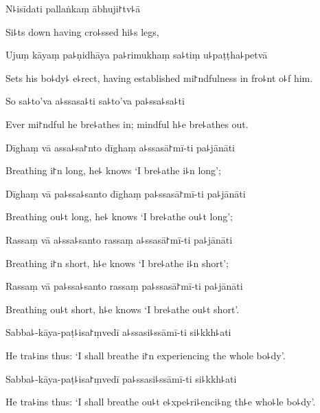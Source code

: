 N꜕isīdati pallaṅkaṃ ābhuji꜓tv꜕ā

\begin{english}
  Si꜕ts down having cro꜕ssed hi꜕s legs,
\end{english}

Ujuṃ kāyaṃ pa꜕ṇidhāya pa꜕rimukhaṃ sa꜕tiṃ u꜕paṭṭha꜕petvā

\begin{english}
  Sets his bo꜕dy꜕ e꜕rect, having established mi꜓ndfulness in fro꜕nt o꜕f him.
\end{english}

So sa꜕to'va a꜕ssasa꜕ti sa꜕to'va pa꜕ssa꜕sa꜕ti

\begin{english}
  Ever mi꜓ndful he bre꜕athes in; mindful h꜕e bre꜕athes out.
\end{english}

Dīghaṃ vā assa꜕sa꜓nto dīghaṃ a꜕ssasā꜓mī-ti pa꜕jānāti

\begin{english}
  Breathing i꜓n long, he꜕ knows `I bre꜕athe i꜕n long';
\end{english}

Dīghaṃ vā pa꜕ssa꜕santo dīghaṃ pa꜕ssasā꜓mī-ti pa꜕jānāti

\begin{english}
  Breathing ou꜕t long, he꜕ knows `I bre꜕athe ou꜕t long';
\end{english}

Rassaṃ vā a꜕ssa꜕santo rassaṃ a꜕ssasā꜓mī-ti pa꜕jānāti

\begin{english}
  Breathing i꜓n short, h꜕e knows `I bre꜕athe i꜕n short';
\end{english}

Rassaṃ vā pa꜕ssa꜕santo rassaṃ pa꜕ssasā꜓mī-ti pa꜕jānāti

\begin{english}
  Breathing ou꜕t short, h꜕e knows `I bre꜕athe ou꜕t short'.
\end{english}

Sabba꜕-kāya-paṭ꜕isa꜓ṃvedī a꜕ssasi꜕ssāmī-ti si꜕kkh꜕ati

\begin{english}
  He tra꜕ins thus: `I shall breathe i꜓n experiencing the whole bo꜕dy'.
\end{english}

Sabba꜕-kāya-paṭ꜕isa꜓ṃvedī pa꜕ssasi꜕ssāmī-ti si꜕kkh꜕ati

\begin{english}
  He tra꜕ins thus: `I shall breathe ou꜕t e꜕xpe꜕ri꜕enci꜕ng th꜕e who꜕le bo꜕dy'.
\end{english}

